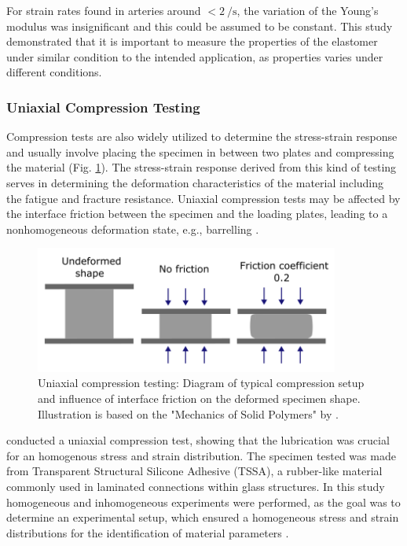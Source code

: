 For strain rates found in arteries around $<\SI[per-mode = symbol]{2}{\per \second}$, the variation of the
Young's modulus was insignificant and this could be assumed to be constant. This study demonstrated 
that it is important to measure the properties of the elastomer under similar condition to the
intended application, as properties varies under different conditions.

\subsubsection*{Uniaxial Compression Testing}
Compression tests are also widely utilized to determine the stress-strain response and 
usually involve placing the specimen in between two plates and compressing the material (Fig. \ref{fig:compressiondiag}).
The stress-strain response derived from this kind of testing serves in determining the deformation 
characteristics of the material including the fatigue and fracture resistance. 
Uniaxial compression tests may be affected by the interface friction between the specimen and 
the loading plates, leading to a nonhomogeneous deformation state, e.g., barrelling \cite{Bergström2015}.\\

\begin{figure}%
        \centering
       \quad
       \includegraphics[width=10cm]{Images/chapter1/compressiondiag.png}%
       \caption[Uniaxial compression testing setup]{Uniaxial compression testing: Diagram of typical compression setup and influence of interface friction on the deformed specimen shape. Illustration is based on the "Mechanics of Solid Polymers" by \citet{Bergström2015}.}%
       \label{fig:compressiondiag}%
\end{figure}

\citet{Drass2018} conducted a uniaxial compression test, showing that the lubrication was 
crucial for an homogenous stress and strain distribution. The specimen tested was made from Transparent Structural 
Silicone Adhesive (TSSA), a rubber-like material commonly used in laminated connections within glass structures.
In this study homogeneous and inhomogeneous experiments were performed, as the goal was to determine an 
experimental setup, which ensured a homogeneous stress and strain distributions for the identification of material parameters \cite{Drass2018}.

